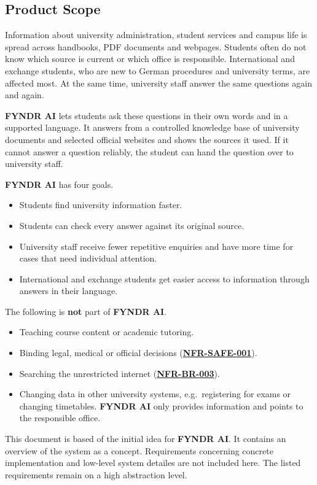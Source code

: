 \documentclass[11pt, a4paper]{article}
\newcommand{\reqref}[1]{\hyperref[req:#1]{\textbf{#1}}}
\begin{document}
\subsection{Product Scope}
Information about university administration, student services and campus life is spread across handbooks, PDF documents and webpages. Students often do not know which source is current or which office is responsible. International and exchange students, who are new to German procedures and university terms, are affected most. At the same time, university staff answer the same questions again and again.

\textbf{FYNDR AI} lets students ask these questions in their own words and in a supported language. It answers from a controlled knowledge base of university documents and selected official websites and shows the sources it used. If it cannot answer a question reliably, the student can hand the question over to university staff.

\textbf{FYNDR AI} has four goals.
\begin{itemize}
    \item Students find university information faster.
    \item Students can check every answer against its original source.
    \item University staff receive fewer repetitive enquiries and have more time for cases that need individual attention.
    \item International and exchange students get easier access to information through answers in their language.
\end{itemize}

The following is \textbf{not} part of \textbf{FYNDR AI}.
\begin{itemize}
    \item Teaching course content or academic tutoring.
    \item Binding legal, medical or official decisions (\reqref{NFR-SAFE-001}).
    \item Searching the unrestricted internet (\reqref{NFR-BR-003}).
    \item Changing data in other university systems, e.g.\ registering for exams or changing timetables. \textbf{FYNDR AI} only provides information and points to the responsible office.
\end{itemize}

This document is based of the initial idea for \textbf{FYNDR AI}. It contains an overview of the system as a concept. Requirements concerning concrete implementation and low-level system detailes are not included here. The listed requirements remain on a high abstraction level.
\end{document}
